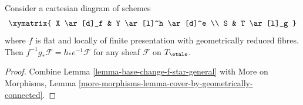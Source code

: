 \begin{lemma}
\label{lemma-fppf-reduced-fibres-base-change-f-star}
Consider a cartesian diagram of schemes
$$
\xymatrix{
X \ar[d]_f & Y \ar[l]^h \ar[d]^e \\
S & T \ar[l]_g
}
$$
where $f$ is flat and locally of finite presentation
with geometrically reduced fibres.
Then $f^{-1}g_*\mathcal{F} = h_*e^{-1}\mathcal{F}$
for any sheaf $\mathcal{F}$ on $T_\etale$.
\end{lemma}

\begin{proof}
Combine Lemma \ref{lemma-base-change-f-star-general} with
More on Morphisms, Lemma
\ref{more-morphisms-lemma-cover-by-geometrically-connected}.
\end{proof}
